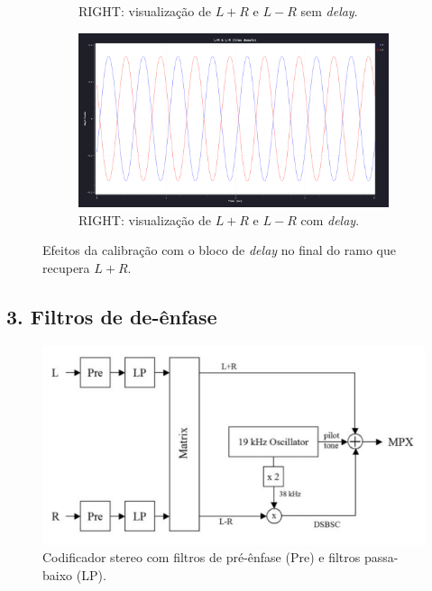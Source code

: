 \begin{figure}[ht]
\begin{subfigure}[b]{0.5\linewidth}
        \caption{RIGHT: visualização de $L+R$ e $L-R$ sem \textit{delay}.} 
        \label{fig:c} 
    \end{subfigure}%
    \begin{subfigure}[b]{0.5\linewidth}
        \centering
        \includegraphics[width=0.9\linewidth]{img/peculiaridades/RIGHT_com_delay.png} 
        \caption{RIGHT: visualização de $L+R$ e $L-R$ com \textit{delay}.} 
        \label{fig:d} 
    \end{subfigure} 
    \caption{Efeitos da calibração com o bloco de \textit{delay} no final do ramo que recupera $L+R$.}
    \label{fig:multiplas}
\end{figure}
\subsection{3. Filtros de de-ênfase}

\begin{figure}[H]
    \centering
    \includegraphics[width = 0.7\linewidth]{img/peculiaridades/encoder_stereo.png}
    \caption{Codificador stereo com filtros de pré-ênfase (Pre) e filtros passa-baixo (LP).}
    \label{fig:stereo_encoder}
\end{figure}

